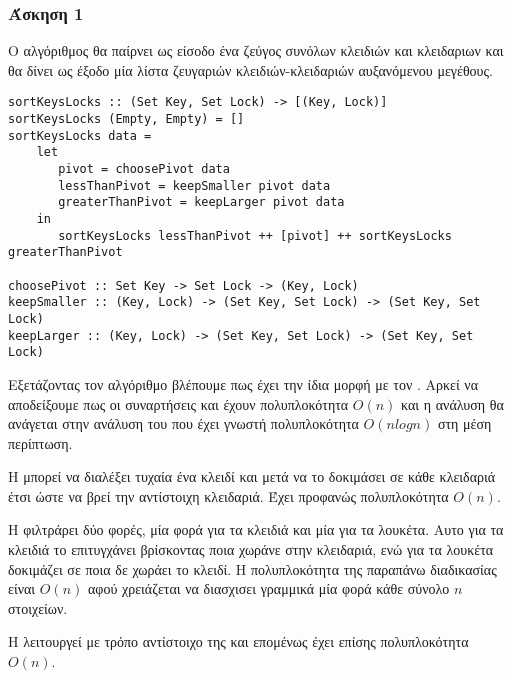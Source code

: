 \newpage
\subsubsection*{Άσκηση 1}

Ο αλγόριθμος θα παίρνει ως είσοδο ένα ζεύγος συνόλων κλειδιών και κλειδαριων και θα
δίνει ως έξοδο μία λίστα ζευγαριών κλειδιών-κλειδαριών αυξανόμενου μεγέθους.


\begin{verbatim}
sortKeysLocks :: (Set Key, Set Lock) -> [(Key, Lock)]
sortKeysLocks (Empty, Empty) = []
sortKeysLocks data =
    let
       pivot = choosePivot data
       lessThanPivot = keepSmaller pivot data
       greaterThanPivot = keepLarger pivot data
    in
       sortKeysLocks lessThanPivot ++ [pivot] ++ sortKeysLocks greaterThanPivot

choosePivot :: Set Key -> Set Lock -> (Key, Lock)
keepSmaller :: (Key, Lock) -> (Set Key, Set Lock) -> (Set Key, Set Lock)
keepLarger :: (Key, Lock) -> (Set Key, Set Lock) -> (Set Key, Set Lock)
\end{verbatim}


Εξετάζοντας τον αλγόριθμο βλέπουμε πως έχει την ίδια μορφή με τον . Αρκεί να αποδείξουμε
πως οι συναρτήσεις  και  έχουν πολυπλοκότητα $O(n)$ και
η ανάλυση θα ανάγεται στην ανάλυση του  που έχει γνωστή πολυπλοκότητα $O(nlogn)$ στη μέση περίπτωση.

Η  μπορεί να διαλέξει τυχαία ένα κλειδί και μετά να το δοκιμάσει σε κάθε κλειδαριά έτσι ώστε να βρεί την αντίστοιχη κλειδαριά.
Έχει προφανώς πολυπλοκότητα $O(n)$.

H  φιλτράρει δύο φορές, μία φορά για τα κλειδιά και μία για τα λουκέτα. 
Αυτο για τα κλειδιά το επιτυγχάνει βρίσκοντας ποια χωράνε στην  κλειδαριά, ενώ
για τα λουκέτα δοκιμάζει σε ποια δε χωράει το  κλειδί. Η πολυπλοκότητα της παραπάνω διαδικασίας
είναι $O(n)$ αφού χρειάζεται να διασχισει γραμμικά μία φορά κάθε σύνολο $n$ στοιχείων.

H  λειτουργεί με τρόπο αντίστοιχο της  και επομένως έχει επίσης
πολυπλοκότητα $O(n)$.
